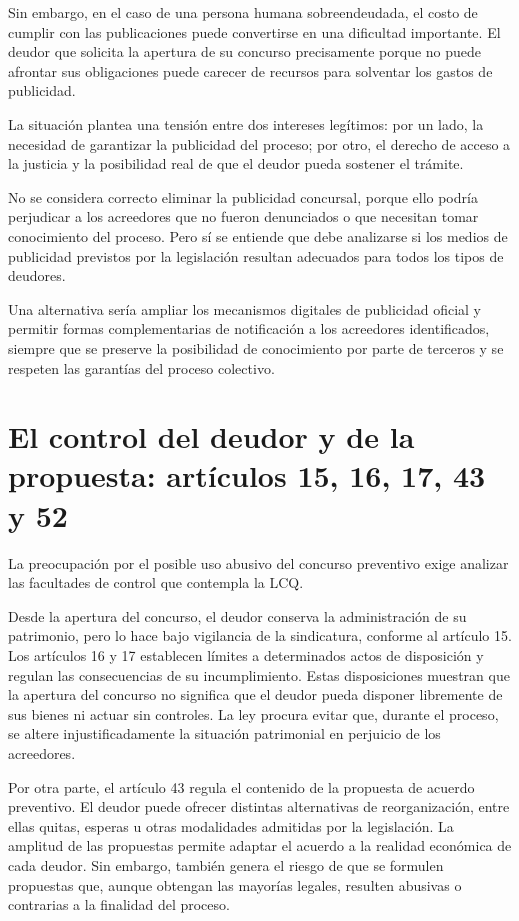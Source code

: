 \documentclass[12pt,oneside]{book}
\begin{document}
Sin embargo, en el caso de una persona humana sobreendeudada, el costo de cumplir con las publicaciones puede convertirse en una dificultad importante. El deudor que solicita la apertura de su concurso precisamente porque no puede afrontar sus obligaciones puede carecer de recursos para solventar los gastos de publicidad.

La situación plantea una tensión entre dos intereses legítimos: por un lado, la necesidad de garantizar la publicidad del proceso; por otro, el derecho de acceso a la justicia y la posibilidad real de que el deudor pueda sostener el trámite.

No se considera correcto eliminar la publicidad concursal, porque ello podría perjudicar a los acreedores que no fueron denunciados o que necesitan tomar conocimiento del proceso. Pero sí se entiende que debe analizarse si los medios de publicidad previstos por la legislación resultan adecuados para todos los tipos de deudores.

Una alternativa sería ampliar los mecanismos digitales de publicidad oficial y permitir formas complementarias de notificación a los acreedores identificados, siempre que se preserve la posibilidad de conocimiento por parte de terceros y se respeten las garantías del proceso colectivo.

\section{El control del deudor y de la propuesta: artículos 15, 16, 17, 43 y 52}

La preocupación por el posible uso abusivo del concurso preventivo exige analizar las facultades de control que contempla la LCQ.

Desde la apertura del concurso, el deudor conserva la administración de su patrimonio, pero lo hace bajo vigilancia de la sindicatura, conforme al artículo 15. Los artículos 16 y 17 establecen límites a determinados actos de disposición y regulan las consecuencias de su incumplimiento. Estas disposiciones muestran que la apertura del concurso no significa que el deudor pueda disponer libremente de sus bienes ni actuar sin controles. La ley procura evitar que, durante el proceso, se altere injustificadamente la situación patrimonial en perjuicio de los acreedores.

Por otra parte, el artículo 43 regula el contenido de la propuesta de acuerdo preventivo. El deudor puede ofrecer distintas alternativas de reorganización, entre ellas quitas, esperas u otras modalidades admitidas por la legislación. La amplitud de las propuestas permite adaptar el acuerdo a la realidad económica de cada deudor. Sin embargo, también genera el riesgo de que se formulen propuestas que, aunque obtengan las mayorías legales, resulten abusivas o contrarias a la finalidad del proceso.
\end{document}
